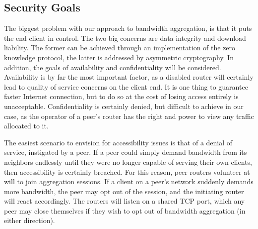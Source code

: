 \documentclass[12pt]{article}
\begin{document}
	\subsection{Security Goals}

		The biggest problem with our approach to bandwidth aggregation, is that it puts the end client in control. The two big concerns are data integrity and download liability. The former can be achieved through an implementation of the zero knowledge protocol, the latter is addressed by asymmetric cryptography. In addition, the goals of availability and confidentiality will be considered. Availability is by far the most important factor, as a disabled router will certainly lead to quality of service concerns on the client end. It is one thing to guarantee faster Internet connection, but to do so at the cost of losing access entirely is unacceptable. Confidentiality is certainly denied, but difficult to achieve in our case, as the operator of a peer's router has the right and power to view any traffic allocated to it.

		The easiest scenario to envision for accessibility issues is that of a denial of service, instigated by a peer. If a peer could simply demand bandwidth from its neighbors endlessly until they were no longer capable of serving their own clients, then accessibility is certainly breached. For this reason, peer routers volunteer at will to join aggregation sessions. If a client on a peer's network suddenly demands more bandwidth, the peer may opt out of the session, and the initiating router will react accordingly. The routers will listen on a shared TCP port, which any peer may close themselves if they wish to opt out of bandwidth aggregation (in either direction).
\end{document}
